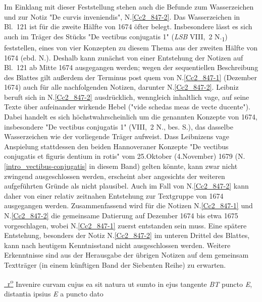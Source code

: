 \begin{ledgroup}
\pend
\pstart
Im Einklang mit dieser Feststellung stehen auch die Befunde zum Wasserzeichen und zur Notiz "De curvis inveniendis", N.\;\ref{Cc2_847-2}. 
\pend
\pstart
Das Wasserzeichen in Bl.~121 ist für die zweite Hälfte von 1674 öfter belegt. Insbesondere lässt es sich auch im Träger des Stücks "De vectibus conjugatis 1" (\textit{LSB} VIII,~2 N.\textsubscript{1}) feststellen, eines von vier Konzepten zu diesem Thema aus der zweiten Hälfte von 1674 (ebd. N.).
Deshalb kann zunächst von einer Entstehung der Notizen auf Bl.~121 ab Mitte 1674 ausgegangen werden; wegen der sequentiellen Beschreibung des Blattes gilt außerdem der Terminus post quem von N.\;\ref{Cc2_847-1} (Dezember 1674) auch für alle nachfolgenden Notizen, darunter N.\;\ref{Cc2_847-2}.
\pend
\pstart
Leibniz beruft sich in N.\;\ref{Cc2_847-2} ausdrücklich, wenngleich inhaltlich vage, auf seine Texte über aufeinander wirkende Hebel ("vide schedas meas de vecte ducente"). Dabei handelt es sich höchstwahrscheinlich um die genannten Konzepte von 1674, insbesondere "De vectibus conjugatis 1" (VIII,~2 N., bes. S.), das dasselbe Wasserzeichen wie der vorliegende Träger aufweist.
Dass Leibnizens vage Anspielung stattdessen den beiden Hannoveraner Konzepte "De vectibus conjugatis et figuris dentium in rotis" vom 25.\;Oktober (4.\;November) 1679 (N.\;\ref{intro_vectibus-conjugatis} in diesem Band) gelten könnte, kann zwar nicht zwingend ausgeschlossen werden, erscheint aber angesichts der weiteren aufgeführten Gründe als nicht plausibel. 
Auch im Fall von N.\;\ref{Cc2_847-2} kann daher von einer relativ zeitnahen Entstehung zur Textgruppe von 1674 ausgegangen werden.
\pend
\pstart
Zusammenfassend wird für die Notizen N.\;\ref{Cc2_847-1} und N.\;\ref{Cc2_847-2} die gemeinsame Datierung auf Dezember 1674 bis etwa 1675 vorgeschlagen, wobei N.\;\ref{Cc2_847-1} zuerst entstanden sein muss.
Eine spätere Entstehung, besonders der Notiz N.\;\ref{Cc2_847-2} im unteren Drittel des Blattes, kann nach heutigem Kenntnisstand nicht ausgeschlossen werden. Weitere Erkenntnisse sind aus der Herausgabe der übrigen Notizen auf dem gemeinsam Textträger (in einem künftigen Band der Siebenten Reihe) zu erwarten.
\pend
\end{ledgroup}
\vspace{8mm}
\pstart
\noindent
\href{\Scan{LH_35_08_30_121r}}%
{~r\textsuperscript{o}\rbrack} 
Invenire curvam
cujus ea sit natura ut sumto in ejus tangente \textit{BT} puncto \textit{E}, distantia ipsius \textit{E} a puncto dato
